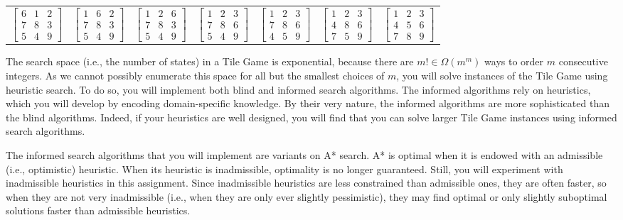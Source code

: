 \documentclass{article}
\begin{document}
\begin{tabular}{ccccccc}
$\begin{bmatrix}
6 & 1 & 2 \\
7 & 8 & 3 \\
5 & 4 & 9
\end{bmatrix}$
&
$\begin{bmatrix}
1 & 6 & 2 \\
7 & 8 & 3 \\
5 & 4 & 9
\end{bmatrix}$
&
$\begin{bmatrix}
1 & 2 & 6 \\
7 & 8 & 3 \\
5 & 4 & 9
\end{bmatrix}$
&
$\begin{bmatrix}
1 & 2 & 3 \\
7 & 8 & 6 \\
5 & 4 & 9
\end{bmatrix}$
&
$\begin{bmatrix}
1 & 2 & 3 \\
7 & 8 & 6 \\
4 & 5 & 9
\end{bmatrix}$
&
$\begin{bmatrix}
1 & 2 & 3 \\
4 & 8 & 6 \\
7 & 5 & 9
\end{bmatrix}$
&
$\begin{bmatrix}
1 & 2 & 3 \\
4 & 5 & 6 \\
7 & 8 & 9
\end{bmatrix}$ \\ [5ex]
\end{tabular}

The search space (i.e., the number of states) in a Tile Game is
exponential, because there are $m! \in \Omega(m^m)$ ways to order $m$
consecutive integers.  As we cannot possibly enumerate this space for
all but the smallest choices of $m$, you will solve instances of the
Tile Game using heuristic search.  To do so, you will implement both
blind and informed search algorithms.  The informed algorithms rely on
heuristics, which you will develop by encoding domain-specific
knowledge.  By their very nature, the informed algorithms are more
sophisticated than the blind algorithms.  Indeed, if your heuristics
are well designed, you will find that you can solve larger Tile Game
instances using informed search algorithms.

The informed search algorithms that you will implement are variants on
A* search.  A* is optimal when it is endowed with an admissible (i.e.,
optimistic) heuristic.  When its heuristic is inadmissible, optimality
is no longer guaranteed.  Still, you will experiment with inadmissible
heuristics in this assignment.  Since inadmissible heuristics are less
constrained than admissible ones, they are often faster, so when they
are not very inadmissible (i.e., when they are only ever slightly
pessimistic), they may find optimal or only slightly suboptimal
solutions faster than admissible heuristics.
\end{document}
